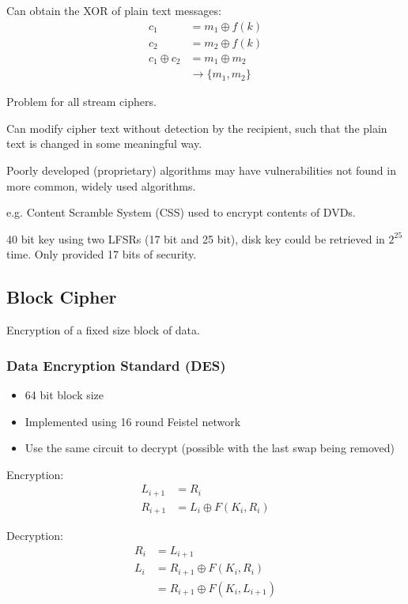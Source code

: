 \documentclass[a4paper]{article}
\begin{document}
Can obtain the XOR of plain text messages:
\begin{align*}
               c_{1} &= m_{1} \oplus f(k) \\
               c_{2} &= m_{2} \oplus f(k) \\
  c_{1} \oplus c_{2} &= m_{1} \oplus m_{2} \\
                     &\rightarrow \{m_{1}, m_{2}\}
\end{align*}


Problem for all stream ciphers.

Can modify cipher text without detection by the recipient, such that the plain
text is changed in some meaningful way.


Poorly developed (proprietary) algorithms may have vulnerabilities not found in
more common, widely used algorithms.

e.g. Content Scramble System (CSS) used to encrypt contents of DVDs.

40 bit key using two LFSRs (17 bit and 25 bit), disk key could be retrieved in
$2^{25}$ time. Only provided 17 bits of security.

\subsection{Block Cipher}

Encryption of a fixed size block of data.

\subsubsection{Data Encryption Standard (DES)}

\begin{itemize}
  \item 64 bit block size
  \item Implemented using 16 round Feistel network
  \item Use the same circuit to decrypt (possible with the last swap being
        removed)
\end{itemize}

Encryption:
\begin{align*}
  L_{i+1} &= R_{i} \\
  R_{i+1} &= L_{i} \oplus F(K_{i}, R_{i})
\end{align*}

Decryption:
\begin{align*}
  R_{i} &= L_{i+1} \\
  L_{i} &= R_{i+1} \oplus F(K_{i}, R_{i}) \\
        &= R_{i+1} \oplus F(K_{i}, L_{i+1})
\end{align*}
\end{document}

